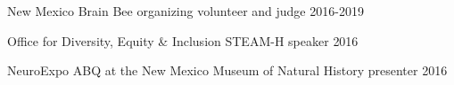 
\begin{cvhonors}
  \cvhonor
    {New Mexico Brain Bee} %
    {organizing volunteer and judge} %
    {} %
    {2016-2019} %
    
  \cvhonor
    {Office for Diversity, Equity \& Inclusion STEAM-H} %
    {speaker} %
    {} %
    {2016} %

  \cvhonor
    {NeuroExpo ABQ at the New Mexico Museum of Natural History} %
    {presenter} %
    {} %
    {2016} %
\end{cvhonors}    
    